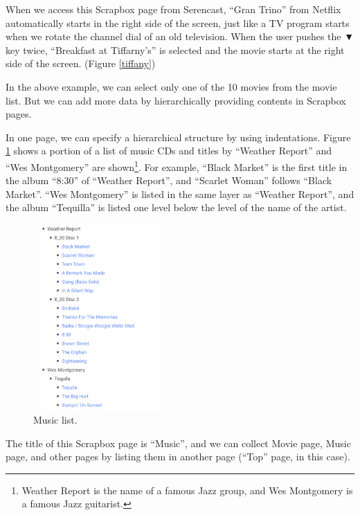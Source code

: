 \documentclass[conference]{IEEEtran}
\def\down{▼}
\def\SC{Serencast}
\def\SB{Scrapbox}
\begin{document}
When we access this {\SB} page from {\SC},
``Gran Trino'' from Netflix automatically starts in the right side of the screen,
just like a TV program starts when we rotate the channel dial of an old television.
When the user pushes the {\down} key twice,
``Breakfast at Tiffarny's'' is selected and
the movie starts at the right side of the screen. (Figure \ref{tiffany})

In the above example, we can select only one of the 10 movies from the movie list.
But we can add more data by hierarchically providing contents in {\SB} pages.

In one page, we can specify a hierarchical structure by using indentations.
Figure \ref{musiclist} shows a portion of a list of music CDs and
titles by ``Weather Report'' and ``Wes Montgomery'' are shown\footnote{
  Weather Report is the name of a famous Jazz group, and Wes Montgomery is a famous Jazz guitarist.
}.
For example, 
``Black Market'' is the first title in the album ``8:30'' of ``Weather Report'', and
``Scarlet Woman'' follows ``Black Market''.
``Wes Montgomery'' is listed in the same layer as ``Weather Report'', and
the album ``Tequilla'' is listed one level below the level of the name of the artist.

\begin{figure}[H]
\centerline{\includegraphics[width=50mm,bb=0 0 652 926]{figures/d8fe8ff8f3e1bbcb34cf51e268592f8c.png}}
\caption{Music list.}
\label{musiclist}
\end{figure}

The title of this {\SB} page is ``Music'', and 
we can collect Movie page, Music page, and other pages by
listing them in another page (``Top'' page, in this case).
\end{document}
